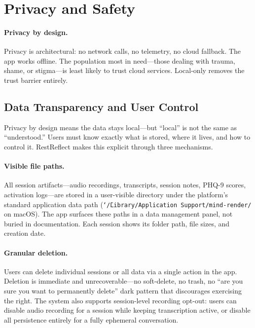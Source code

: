 \documentclass{article}
\begin{document}
\section{Privacy and Safety}

\paragraph{Privacy by design.} Privacy is architectural: no network calls, no telemetry, no cloud fallback. The app works offline. The population most in need---those dealing with trauma, shame, or stigma---is least likely to trust cloud services. Local-only removes the trust barrier entirely.

\subsection{Data Transparency and User Control}

Privacy by design means the data stays local---but ``local'' is not the same as ``understood.'' Users must know exactly what is stored, where it lives, and how to control it. RestReflect makes this explicit through three mechanisms.

\paragraph{Visible file paths.} All session artifacts---audio recordings, transcripts, session notes, PHQ-9 scores, activation logs---are stored in a user-visible directory under the platform's standard application data path (\texttt{\char`\~/Library/Application Support/mind-render/} on macOS). The app surfaces these paths in a data management panel, not buried in documentation. Each session shows its folder path, file sizes, and creation date.

\paragraph{Granular deletion.} Users can delete individual sessions or all data via a single action in the app. Deletion is immediate and unrecoverable---no soft-delete, no trash, no ``are you sure you want to permanently delete'' dark pattern that discourages exercising the right. The system also supports session-level recording opt-out: users can disable audio recording for a session while keeping transcription active, or disable all persistence entirely for a fully ephemeral conversation.
\end{document}
